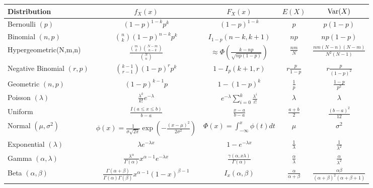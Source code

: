 \documentclass{article}
\newcommand{\var}{\textup{Var}}
\begin{document}
\begin{tabular}{|lcccc|}
\hline

Distribution & $f_X(x)$ & $F_X(x)$ & $E(X)$ & $\var(X)$\\
\hline

Bernoulli $(p)$
& $(1-p)^{1-k}p^k$
& $(1-p)^{1-k}$
& $p$
& $p(1-p)$\\

Binomial $(n,p)$
& $\binom{n}{k}(1-p)^{n-k}p^k$
& $I_{1-p}(n-k,k+1)$
& $np$
& $np(1-p)$\\

Hypergeometric(N,m,n)
& $\frac{\binom{m}{k}\binom{N-m}{n-k}}{\binom{N}{n}}$
& $\approx \Phi \left ( \frac{k-np}{\sqrt{np(1-p)}} \right )$
& $\frac{nm}{N}$
& $\frac{nm(N-n)(N-m)}{N^2(N-1)}$\\

Negative Binomial $(r,p)$
& $\binom{k-1}{r-1}(1-p)^r p^k$
& $1 - I_p(k+1,r)$
& $r\frac{p}{1-p}$
& $r\frac{p}{(1-p)^2}$\\

Geometric $(n,p)$
& $(1-p)^{k-1}p$
& $1-(1-p)^k$
& $\frac{1}{p}$
& $\frac{1-p}{p^2}$\\

Poisson $(\lambda)$
& $\frac{\lambda^k}{k!}e^{-\lambda}$
& $e^{-\lambda} \sum_{i=0}^k \frac{\lambda^i}{i!}$
& $\lambda$
& $\lambda$\\
\hline

Uniform
& $\frac{I(a \leq x \leq b)}{b-a}$
& $\frac{x - a}{b-a}$
& $\frac{a + b}{2}$
& $\frac{(b-a)^2}{12}$\\

Normal $(\mu, \sigma^2)$
& $\phi(x) = \frac{1}{\sigma \sqrt{2 \pi}} \exp \left ( - \frac{(x-\mu)^2}{2 \sigma^2} \right )$
& $\Phi(x) = \int_{-\infty}^x \phi(t) dt$
& $\mu$
& $\sigma^2$\\

Exponential $(\lambda)$
& $\lambda e^{-\lambda x}$
& $1 - e^{-\lambda x}$
& $\frac{1}{\lambda}$
& $\frac{1}{\lambda^2}$\\

Gamma $(\alpha, \lambda)$
& $\frac{\lambda^{\alpha}}{\Gamma(\alpha)} x^{\alpha - 1}e^{-\lambda x}$
& $\frac{\gamma(\alpha, x \lambda)}{\Gamma(\alpha)}$
& $\frac{\alpha}{\lambda}$
& $\frac{\alpha}{\lambda^2}$\\

Beta $(\alpha, \beta)$
& $\frac{\Gamma(\alpha + \beta)}{\Gamma(\alpha) \Gamma(\beta)} x^{\alpha - 1} (1 - x)^{\beta - 1}$
& $I_x(\alpha, \beta)$
& $\frac{\alpha}{\alpha + \beta}$
& $\frac{\alpha \beta}{(\alpha + \beta)^2(\alpha + \beta + 1)}$\\
\hline

\end{tabular}
\end{document}
